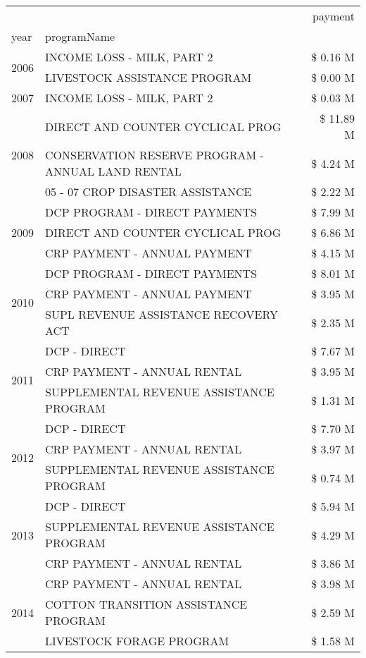 \begin{tabular}{llr}
\toprule
 &  & payment \\
year & programName &  \\
\midrule
\multirow[t]{2}{*}{2006} & INCOME LOSS - MILK, PART 2 & \$ 0.16 M \\
 & LIVESTOCK ASSISTANCE PROGRAM & \$ 0.00 M \\
\cline{1-3}
2007 & INCOME LOSS - MILK, PART 2 & \$ 0.03 M \\
\cline{1-3}
\multirow[t]{3}{*}{2008} & DIRECT AND COUNTER CYCLICAL PROG & \$ 11.89 M \\
 & CONSERVATION RESERVE PROGRAM - ANNUAL LAND RENTAL & \$ 4.24 M \\
 & 05 - 07 CROP DISASTER ASSISTANCE & \$ 2.22 M \\
\cline{1-3}
\multirow[t]{3}{*}{2009} & DCP PROGRAM - DIRECT PAYMENTS & \$ 7.99 M \\
 & DIRECT AND COUNTER CYCLICAL PROG & \$ 6.86 M \\
 & CRP PAYMENT - ANNUAL PAYMENT & \$ 4.15 M \\
\cline{1-3}
\multirow[t]{3}{*}{2010} & DCP PROGRAM - DIRECT PAYMENTS & \$ 8.01 M \\
 & CRP PAYMENT - ANNUAL PAYMENT & \$ 3.95 M \\
 & SUPL REVENUE ASSISTANCE RECOVERY ACT & \$ 2.35 M \\
\cline{1-3}
\multirow[t]{3}{*}{2011} & DCP - DIRECT & \$ 7.67 M \\
 & CRP PAYMENT - ANNUAL RENTAL & \$ 3.95 M \\
 & SUPPLEMENTAL REVENUE ASSISTANCE PROGRAM & \$ 1.31 M \\
\cline{1-3}
\multirow[t]{3}{*}{2012} & DCP - DIRECT & \$ 7.70 M \\
 & CRP PAYMENT - ANNUAL RENTAL & \$ 3.97 M \\
 & SUPPLEMENTAL REVENUE ASSISTANCE PROGRAM & \$ 0.74 M \\
\cline{1-3}
\multirow[t]{3}{*}{2013} & DCP - DIRECT & \$ 5.94 M \\
 & SUPPLEMENTAL REVENUE ASSISTANCE PROGRAM & \$ 4.29 M \\
 & CRP PAYMENT - ANNUAL RENTAL & \$ 3.86 M \\
\cline{1-3}
\multirow[t]{3}{*}{2014} & CRP PAYMENT - ANNUAL RENTAL & \$ 3.98 M \\
 & COTTON TRANSITION ASSISTANCE PROGRAM & \$ 2.59 M \\
 & LIVESTOCK FORAGE PROGRAM & \$ 1.58 M \\

\end{tabular}
